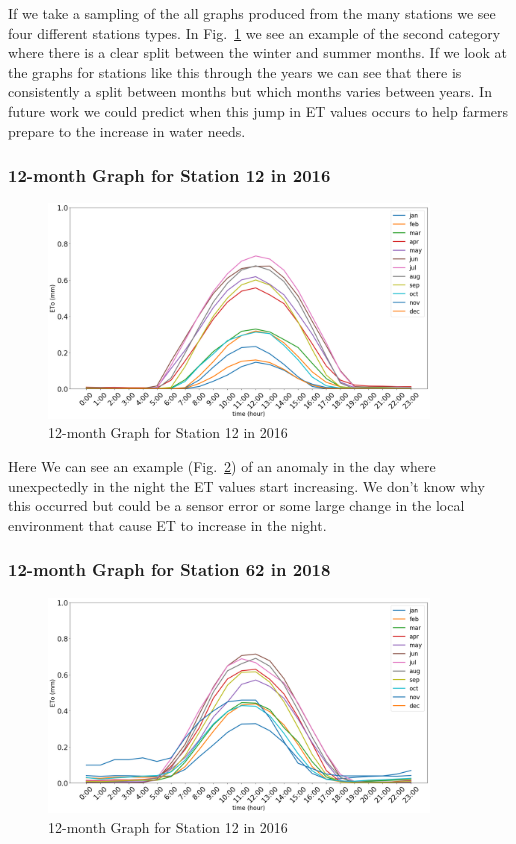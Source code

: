 \begin{frame}
	If we take a sampling of the all graphs produced from the many stations we see four different stations types. In Fig.~\ref{fig:12-2016} we see an example of the second category where there is a clear split between the winter and summer months. If we look at the graphs for stations like this through the years we can see that there is consistently a split between months but which months varies between years. In future work we could predict when this jump in ET values occurs to help farmers prepare to the increase in water needs. 
\end{frame}

\begin{frame}
\frametitle{12-month Graph for Station 12 in 2016}
\centering
\begin{figure}
	\includegraphics[width=0.9\textwidth]{images/12-2016.png}
	\caption{12-month Graph for Station 12 in 2016}\label{fig:12-2016}
\end{figure}
\end{frame}

\begin{frame}
	Here We can see an example (Fig.~\ref{fig:62-2018}) of an anomaly in the day where unexpectedly in the night the ET values start increasing. We don't know why this occurred but could be a sensor error or some large change in the local environment that cause ET to increase in the night.
\end{frame}

\begin{frame}
\frametitle{12-month Graph for Station 62 in 2018}
\centering
\begin{figure}
	\includegraphics[width=0.9\textwidth]{images/62-2018.png}
	\caption{12-month Graph for Station 12 in 2016}\label{fig:62-2018}
\end{figure}
\end{frame}


